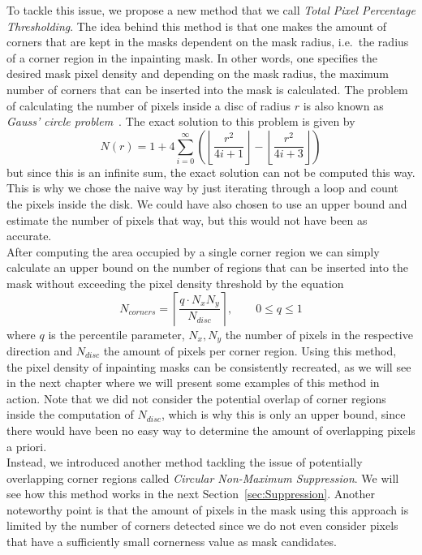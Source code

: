 To tackle this issue, we propose a new method that we call \textit{Total Pixel Percentage
Thresholding}. The idea behind this method is that one makes the amount of corners that are kept
in the masks dependent on the mask radius, i.e.\ the radius of a corner region in the inpainting
mask.\newpage\noindent
In other words, one specifies the desired mask pixel density and depending on the mask
radius, the maximum number of corners that can be inserted into the mask is
calculated.
The problem of calculating the number of pixels inside a disc of radius $r$ is also known as
\textit{Gauss' circle problem}~\cite{gaussCircle}. The exact solution to this problem is given
by~\cite{hilbert96}
\begin{equation}
    N(r) = 1 + 4\sum_{i=0}^{\infty}\left(\left\lfloor\frac{r^2}{4i+1}\right\rfloor - \left\lfloor
    \frac{r^2}{4i+3}\right\rfloor\right)
\end{equation}
but since this is an infinite sum, the exact solution can not be computed this way. This is why we
chose the naive way by just iterating through a loop and count the pixels inside the disk.
We could have also chosen to use an upper bound and estimate the number of pixels that 
way, but this would not have been as accurate.\\
After computing the area occupied by a single corner region we can simply calculate an upper bound on the number of
regions that can be inserted into the mask without exceeding the pixel density threshold by the equation
\begin{equation}
    N_{corners} = \left\lceil \frac{q \cdot N_{x}N_{y}}{N_{disc}} \right\rceil,\qquad0\leq q\leq 1 
\end{equation}
where $q$ is the percentile parameter, $N_x, N_y$ the number of pixels in the respective direction
and $N_{disc}$ the amount of pixels per corner region. 
Using this method, the pixel density of inpainting masks can be consistently recreated, as we will
see in the next chapter where we will present some examples of this method in
action.\newpage\noindent
Note that we did not consider the potential overlap of corner regions inside the
computation of $N_{disc}$, which is why this is only an upper bound, since there would have been no 
easy way to determine the amount of overlapping pixels a priori.\\
Instead, we introduced another method tackling the issue of potentially overlapping corner regions
called \textit{Circular Non-Maximum Suppression}. We will see how this method
works in the next Section~\ref{sec:Suppression}.
Another noteworthy point is that the amount of pixels in the mask using this approach is limited by
the number of corners detected since we do not even consider pixels that have a sufficiently small
cornerness value as mask candidates.
